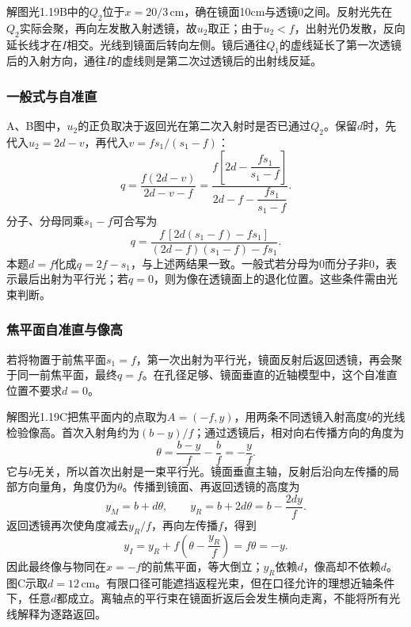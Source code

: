 \documentclass[UTF8,fontset=fandol,a4paper,11pt]{ctexart}
\begin{document}
解图光1.19B中的$Q_2$位于$x=20/3\,\mathrm{cm}$，确在镜面10cm与透镜0之间。反射光先在$Q_2$实际会聚，再向左发散入射透镜，故$u_2$取正；由于$u_2<f$，出射光仍发散，反向延长线才在$I$相交。光线到镜面后转向左侧。镜后通往$Q_1$的虚线延长了第一次透镜后的入射方向，通往$I$的虚线则是第二次过透镜后的出射线反延。

\subsubsection*{一般式与自准直}
A、B图中，$u_2$的正负取决于返回光在第二次入射时是否已通过$Q_2$。保留$d$时，先代入$u_2=2d-v$，再代入$v=fs_1/(s_1-f)$：
\[
q=\frac{f(2d-v)}{2d-v-f}
 =\frac{f\left[2d-\dfrac{fs_1}{s_1-f}\right]}
 {2d-f-\dfrac{fs_1}{s_1-f}}.
\]
分子、分母同乘$s_1-f$可合写为
\[
q=\frac{f\,[2d(s_1-f)-fs_1]}
{(2d-f)(s_1-f)-fs_1}.
\]
本题$d=f$化成$q=2f-s_1$，与上述两结果一致。一般式若分母为0而分子非0，表示最后出射为平行光；若$q=0$，则为像在透镜面上的退化位置。这些条件需由光束判断。

\subsubsection*{焦平面自准直与像高}
若将物置于前焦平面$s_1=f$，第一次出射为平行光，镜面反射后返回透镜，再会聚于同一前焦平面，最终$q=f$。在孔径足够、镜面垂直的近轴模型中，这个自准直位置不要求$d=0$。

解图光1.19C把焦平面内的点取为$A=(-f,y)$，用两条不同透镜入射高度$b$的光线检验像高。首次入射角约为$(b-y)/f$；通过透镜后，相对向右传播方向的角度为
\[
\theta=\frac{b-y}{f}-\frac b f=-\frac y f.
\]
它与$b$无关，所以首次出射是一束平行光。镜面垂直主轴，反射后沿向左传播的局部方向量角，角度仍为$\theta$。传播到镜面、再返回透镜的高度为
\[
y_M=b+d\theta,\qquad
y_R=b+2d\theta=b-\frac{2dy}{f}.
\]
返回透镜再次使角度减去$y_R/f$，再向左传播$f$，得到
\[
y_I=y_R+f\left(\theta-\frac{y_R}{f}\right)
=f\theta=-y.
\]
因此最终像与物同在$x=-f$的前焦平面，等大倒立；$y_R$依赖$d$，像高却不依赖$d$。图C示取$d=12\,\mathrm{cm}$。有限口径可能遮挡返程光束，但在口径允许的理想近轴条件下，任意$d$都成立。离轴点的平行束在镜面折返后会发生横向走离，不能将所有光线解释为逐路返回。
\end{document}
